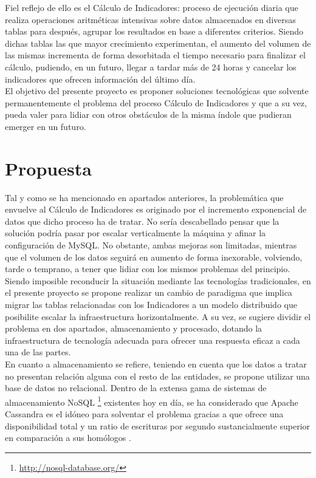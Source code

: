 Fiel reflejo de ello es el Cálculo de Indicadores: proceso de ejecución diaria que realiza operaciones aritméticas intensivas sobre datos almacenados en diversas tablas para después, agrupar los resultados en base a diferentes criterios. Siendo dichas tablas las que mayor crecimiento experimentan, el aumento del volumen de las mismas incrementa de forma desorbitada el tiempo necesario para finalizar el cálculo, pudiendo, en un futuro, llegar a tardar más de 24 horas y cancelar los indicadores que ofrecen información del último día.\\

El objetivo del presente proyecto es proponer soluciones tecnológicas que solvente permanentemente el problema del proceso Cálculo de Indicadores y que a su vez, pueda valer para lidiar con otros obstáculos de la misma índole que pudieran emerger en un futuro.\\

\section{Propuesta}

Tal y como se ha mencionado en apartados anteriores, la problemática que envuelve al Cálculo de Indicadores es originado por el incremento exponencial de datos que dicho proceso ha de tratar. No sería descabellado pensar que la solución podría pasar por escalar verticalmente la máquina y afinar la configuración de MySQL. No obstante, ambas mejoras son limitadas, mientras que el volumen de los datos seguirá en aumento de forma inexorable, volviendo, tarde o temprano, a tener que lidiar con los mismos problemas del principio.\\

Siendo imposible reconducir la situación mediante las tecnologías tradicionales, en el presente proyecto se propone realizar un cambio de paradigma que implica migrar las tablas relacionadas con los Indicadores a un modelo distribuido que posibilite escalar la infraestructura horizontalmente. A su vez, se sugiere dividir el problema en dos apartados, almacenamiento y procesado, dotando la infraestructura de tecnología adecuada para ofrecer una respuesta eficaz a cada una de las partes.\\

En cuanto a almacenamiento se refiere, teniendo en cuenta que los datos a tratar no presentan relación alguna con el resto de las entidades, se propone utilizar una base de datos no relacional. Dentro de la extensa gama de sistemas de almacenamiento NoSQL \footnote{\url{http://nosql-database.org/}} existentes hoy en día, se ha considerado que Apache Cassandra \cite{lakshman2010cassandra} es el idóneo para solventar el problema gracias a que ofrece una disponibilidad total y un ratio de escrituras por segundo sustancialmente superior en comparación a sus homólogos \cite{rabl2012solving}.\\

